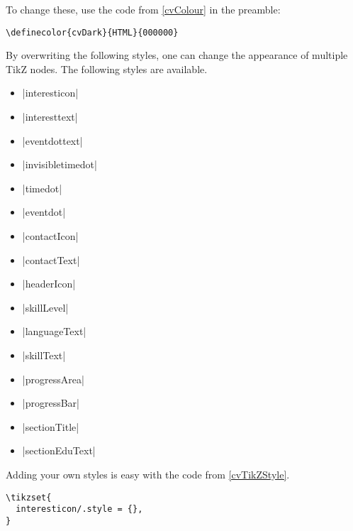 \documentclass{ltxdoc}
\begin{document}
  To change these, use the code from \cref{cvColour} in the preamble:
  
  \begin{lstlisting}[caption={Colour editing.},label=cvColour]
\definecolor{cvDark}{HTML}{000000}
  \end{lstlisting}
  
  By overwriting the following styles, one can change the appearance of multiple TikZ nodes. The following styles are available.
  \begin{itemize}
    \item |interesticon|
    \item |interesttext|
    \item |eventdottext|
    \item |invisibletimedot|
    \item |timedot|
    \item |eventdot|
    \item |contactIcon|
    \item |contactText|
    \item |headerIcon|
    \item |skillLevel|
    \item |languageText|
    \item |skillText|
    \item |progressArea|
    \item |progressBar|
    \item |sectionTitle|
    \item |sectionEduText|
  \end{itemize}
  
  Adding your own styles is easy with the code from \cref{cvTikZStyle}.
  
  \begin{lstlisting}[caption={Change TikZ style.},label=cvTikZStyle]
\tikzset{
  interesticon/.style = {},
}
  \end{lstlisting}
  
\end{document}
